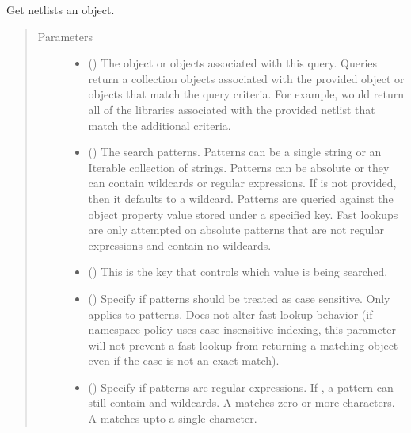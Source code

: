 \documentclass[letterpaper,10pt,english,openany,oneside]{sphinxmanual}
\begin{document}
\begin{fulllineitems}
\label{\detokenize{reference/classes/generated/spydrnet.get_netlists:spydrnet.get_netlists}}
Get netlists  an object.
\begin{quote}\begin{description}
\item[{Parameters}] \leavevmode\begin{itemize}
\item {} 
 () \textendash{} The object or objects associated with this query. Queries return a collection objects associated with the
provided object or objects that match the query criteria. For example,  would
return all of the libraries associated with the provided netlist that match the additional criteria.

\item {} 
 () \textendash{} The search patterns. Patterns can be a single string or an Iterable collection of strings. Patterns can be
absolute or they can contain wildcards or regular expressions. If  is not provided, then it defaults
to a wildcard. Patterns are queried against the object property value stored under a specified key. Fast lookups
are only attempted on absolute patterns that are not regular expressions and contain no wildcards.

\item {} 
 () \textendash{} This is the key that controls which value is being searched.

\item {} 
 () \textendash{} Specify if patterns should be treated as case sensitive. Only applies to patterns. Does not alter fast lookup
behavior (if namespace policy uses case insensitive indexing, this parameter will not prevent a fast lookup
from returning a matching object even if the case is not an exact match).

\item {} 
 () \textendash{} Specify if patterns are regular expressions. If , a pattern can still contain \sphinxtitleref{*} and  wildcards. A
\sphinxtitleref{*} matches zero or more characters. A  matches upto a single character.


\end{itemize}
\end{description}
\end{quote}
\end{fulllineitems}
\end{document}
